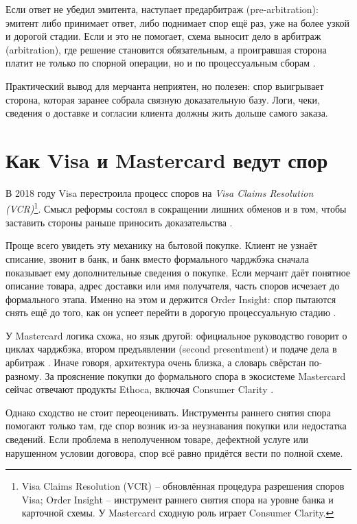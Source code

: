 Если ответ не убедил эмитента, наступает предарбитраж (pre-arbitration):
эмитент либо принимает ответ, либо поднимает спор ещё раз, уже на более
узкой и дорогой стадии. Если и это не помогает, схема выносит дело в
арбитраж (arbitration), где решение становится обязательным, а
проигравшая сторона платит не только по спорной операции, но и по
процессуальным сборам \cite{visa-dispute-rules}\cite{mc-chargeback-guide}.

Практический вывод для мерчанта неприятен, но полезен: спор
выигрывает сторона, которая заранее собрала связную доказательную
базу. Логи, чеки, сведения о доставке и согласии клиента должны жить
дольше самого заказа.

\section{Как Visa и Mastercard ведут спор}
\label{sec:disputes-vcr-mc}

В 2018 году Visa перестроила процесс споров на \emph{Visa Claims
Resolution (VCR)}\footnote{Visa Claims Resolution (VCR) -- обновлённая процедура разрешения споров Visa; Order Insight -- инструмент раннего снятия спора на уровне банка и карточной схемы. У Mastercard сходную роль играет Consumer Clarity.}.
Смысл реформы состоял в сокращении лишних обменов и в том, чтобы
заставить стороны раньше приносить доказательства
\cite{visa-vcr-merchants}\cite{visa-dispute-rules}.

Проще всего увидеть эту механику на бытовой покупке. Клиент не узнаёт
списание, звонит в банк, и банк вместо формального чарджбэка сначала
показывает ему дополнительные сведения о покупке. Если мерчант даёт
понятное описание товара, адрес доставки или имя получателя, часть
споров исчезает до формального этапа. Именно на этом и держится
Order Insight: спор пытаются снять ещё до того, как он успеет перейти
в дорогую процессуальную стадию \cite{visa-order-insight}.

У Mastercard логика схожа, но язык другой: официальное
руководство говорит о циклах чарджбэка, втором предъявлении
(second presentment) и подаче
дела в арбитраж \cite{mc-chargeback-guide}. Иначе говоря,
архитектура очень близка, а словарь свёрстан по-разному.
За прояснение покупки до формального спора в экосистеме
Mastercard сейчас отвечают продукты Ethoca, включая Consumer
Clarity \cite{mc-dispute-management}.

Однако сходство не стоит переоценивать. Инструменты раннего снятия
спора помогают только там, где спор возник из-за неузнавания покупки
или недостатка сведений. Если проблема в неполученном товаре, дефектной
услуге или нарушенном условии договора, спор всё равно придётся вести
по полной схеме.

